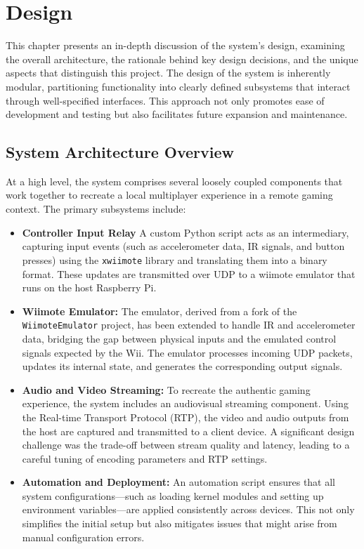 \chapter{Design}
\label{chapter:design}

This chapter presents an in-depth discussion of the system's design, examining the overall architecture, the rationale behind key design decisions, and the unique aspects that distinguish this project. The design of the system is inherently modular, partitioning functionality into clearly defined subsystems that interact through well-specified interfaces. This approach not only promotes ease of development and testing but also facilitates future expansion and maintenance.

\section{System Architecture Overview}

At a high level, the system comprises several loosely coupled components that work together to recreate a local multiplayer experience in a remote gaming context. The primary subsystems include:

\begin{itemize}
	\item \textbf{Controller Input Relay}
	      A custom Python script acts as an intermediary, capturing input events (such as accelerometer data, IR signals, and button presses) using the \texttt{xwiimote} library\cite{xwiimote} and translating them into a binary format. These updates are transmitted over UDP to a wiimote emulator that runs on the host Raspberry Pi.

	\item \textbf{Wiimote Emulator:}
	      The emulator, derived from a fork\cite{jr_wiimote_emu} of the \texttt{WiimoteEmulator} project\cite{wiimote_emulator}, has been extended to handle IR and accelerometer data, bridging the gap between physical inputs and the emulated control signals expected by the Wii. The emulator processes incoming UDP packets, updates its internal state, and generates the corresponding output signals.

	\item \textbf{Audio and Video Streaming:}
	      To recreate the authentic gaming experience, the system includes an audiovisual streaming component. Using the Real-time Transport Protocol (RTP), the video and audio outputs from the host are captured and transmitted to a client device. A significant design challenge was the trade-off between stream quality and latency, leading to a careful tuning of encoding parameters and RTP settings.

	\item \textbf{Automation and Deployment:}
	      An automation script ensures that all system configurations—such as loading kernel modules and setting up environment variables—are applied consistently across devices. This not only simplifies the initial setup but also mitigates issues that might arise from manual configuration errors.
\end{itemize}

